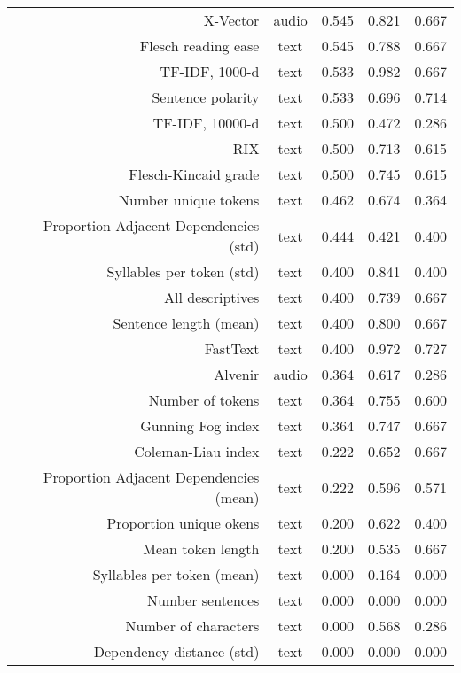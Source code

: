 \begin{tabular}{rc||ccc}
                               X-Vector &    audio &     0.545 & 0.821 &      0.667 \\
                    Flesch reading ease &     text &     0.545 & 0.788 &      0.667 \\
                         TF-IDF, 1000-d &     text &     0.533 & 0.982 &      0.667 \\
                      Sentence polarity &     text &     0.533 & 0.696 &      0.714 \\
                        TF-IDF, 10000-d &     text &     0.500 & 0.472 &      0.286 \\
                                    RIX &     text &     0.500 & 0.713 &      0.615 \\
                   Flesch-Kincaid grade &     text &     0.500 & 0.745 &      0.615 \\
                   Number unique tokens &     text &     0.462 & 0.674 &      0.364 \\
 Proportion Adjacent Dependencies (std) &     text &     0.444 & 0.421 &      0.400 \\
              Syllables per token (std) &     text &     0.400 & 0.841 &      0.400 \\
                       All descriptives &     text &     0.400 & 0.739 &      0.667 \\
                 Sentence length (mean) &     text &     0.400 & 0.800 &      0.667 \\
                               FastText &     text &     0.400 & 0.972 &      0.727 \\
                                Alvenir &    audio &     0.364 & 0.617 &      0.286 \\
                       Number of tokens &     text &     0.364 & 0.755 &      0.600 \\
                      Gunning Fog index &     text &     0.364 & 0.747 &      0.667 \\
                     Coleman-Liau index &     text &     0.222 & 0.652 &      0.667 \\
Proportion Adjacent Dependencies (mean) &     text &     0.222 & 0.596 &      0.571 \\
                Proportion unique okens &     text &     0.200 & 0.622 &      0.400 \\
                      Mean token length &     text &     0.200 & 0.535 &      0.667 \\
             Syllables per token (mean) &     text &     0.000 & 0.164 &      0.000 \\
                       Number sentences &     text &     0.000 & 0.000 &      0.000 \\
                   Number of characters &     text &     0.000 & 0.568 &      0.286 \\
              Dependency distance (std) &     text &     0.000 & 0.000 &      0.000 \\
\bottomrule
\end{tabular}
